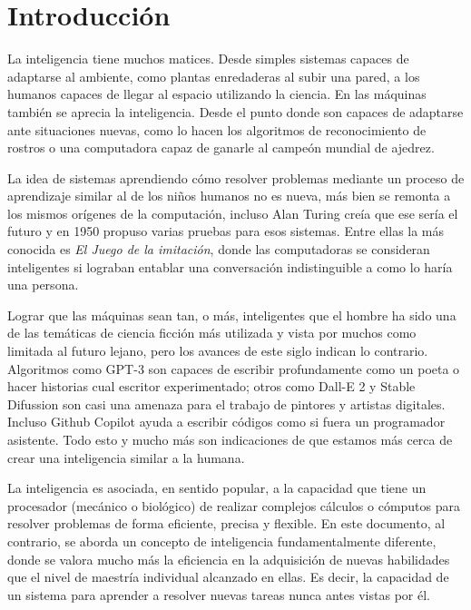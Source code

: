 \chapter*{Introducción}\label{chapter:introduction}
La inteligencia tiene muchos matices. Desde simples sistemas capaces de adaptarse al ambiente, como plantas enredaderas al subir una pared, a los humanos capaces de llegar al espacio utilizando la ciencia. En las máquinas también se aprecia la inteligencia. Desde el punto donde son capaces de adaptarse ante situaciones nuevas, como lo hacen los algoritmos de reconocimiento de rostros o una computadora capaz de ganarle al campeón mundial de ajedrez. 

La idea de sistemas aprendiendo cómo resolver problemas mediante un proceso de aprendizaje similar al de los niños humanos no es nueva, más bien se remonta a los mismos orígenes de la computación, incluso Alan Turing creía que ese sería el futuro y en 1950 propuso varias pruebas para esos sistemas. Entre ellas la más conocida es \textit{El Juego de la imitación}, donde las computadoras se consideran inteligentes si lograban entablar una conversación indistinguible a como lo haría una persona.

Lograr que las máquinas sean tan, o más, inteligentes que el hombre ha sido una de las temáticas de ciencia ficción más utilizada y vista por muchos como limitada al futuro lejano, pero los avances de este siglo indican lo contrario. Algoritmos como GPT-3 son capaces de escribir profundamente como un poeta o hacer historias cual escritor experimentado; otros como Dall-E 2 y Stable Difussion son casi una amenaza para el trabajo de pintores y artistas digitales. Incluso Github Copilot ayuda a escribir códigos como si fuera un programador asistente. Todo esto y mucho más son indicaciones de que estamos más cerca de crear una inteligencia similar a la humana.

La inteligencia es asociada, en sentido popular, a la capacidad que tiene un procesador (mecánico o biológico) de realizar complejos cálculos o cómputos para resolver problemas de forma eficiente, precisa y flexible. En este documento, al contrario, se aborda un concepto de inteligencia fundamentalmente diferente, donde se valora mucho más la eficiencia en la adquisición de nuevas habilidades que el nivel de maestría individual alcanzado en ellas. Es decir, la capacidad de un sistema para aprender a resolver nuevas tareas nunca antes vistas por él.

